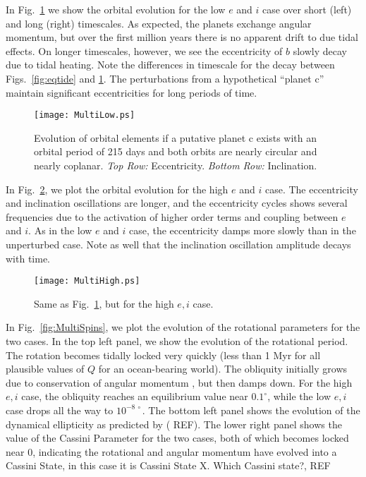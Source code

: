 \documentclass[preprint,12pt]{aastex}
\newcommand{\xxx}[1]{{\color{red} #1}} %
\newcommand{\xxx}[1]{{\color{red} #1}} %
\begin{document}
In Fig.~\ref{fig:MultiLow} we show the orbital evolution for the low
$e$ and $i$ case over short (left) and long (right) timescales. As
expected, the planets exchange angular momentum, but over the first
million years there is no apparent drift to due tidal effects. On
longer timescales, however, we see the eccentricity of $b$ slowly decay
due to tidal heating. Note the differences in timescale for the decay
between Figs.~\ref{fig:eqtide} and \ref{fig:MultiLow}. The
perturbations from a hypothetical ``planet c'' maintain significant
eccentricities for long periods of time.

\begin{figure} 
\begin{center}
\texttt{[image: MultiLow.ps]}
\end{center}
\caption{Evolution of orbital elements if a putative planet c exists with an orbital period of 215 days and both orbits are nearly circular and nearly coplanar. {\it Top Row:} Eccentricity. {\it Bottom Row:} Inclination.}
\label{fig:MultiLow}
\end{figure}

In Fig.~\ref{fig:MultiHigh}, we plot the orbital evolution for the
high $e$ and $i$ case. The eccentricity and inclination oscillations
are longer, and the eccentricity cycles shows several frequencies due
to the activation of higher order terms and coupling between $e$ and
$i$. As in the low $e$ and $i$ case, the eccentricity damps more
slowly than in the unperturbed case. Note as well that the inclination
oscillation amplitude decays with time.

\begin{figure} 
\begin{center}
\texttt{[image: MultiHigh.ps]}
\end{center}
\caption{Same as Fig.~\ref{fig:MultiLow}, but for the high $e,i$ case.}
\label{fig:MultiHigh}
\end{figure}

In Fig.~\ref{fig:MultiSpins}, we plot the evolution of the rotational
parameters for the two cases. In the top left panel, we show the
evolution of the rotational period. The rotation becomes tidally
locked very quickly (less than 1 Myr for all plausible values of $Q$
for an ocean-bearing world). The obliquity initially grows due to
conservation of angular momentum \citep{Correia08}, but then damps
down. For the high $e,i$ case, the obliquity reaches an equilibrium
value near $0.1^\circ$, while the low $e,i$ case drops all the way to
$10^{-8~\circ}$. The bottom left panel shows the evolution of the
dynamical ellipticity as predicted by (\xxx{REF}). The lower right panel
shows the value of the Cassini Parameter for the two cases, both of
which becomes locked near 0, indicating the rotational and angular
momentum have evolved into a Cassini State, in this case it is Cassini
State X. \xxx{Which Cassini state?, REF}
\end{document}
